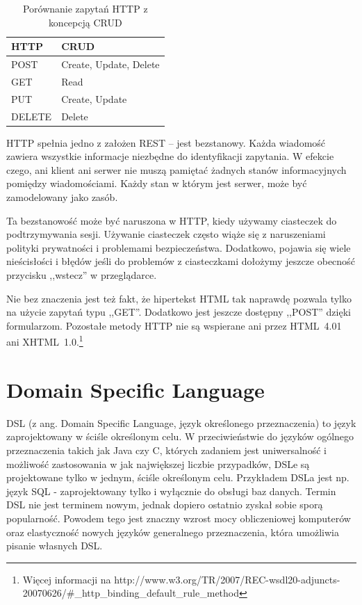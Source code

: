 \documentclass[a4paper,12pt,oneside]{report}
\begin{document}
\begin{table}[h]
  \centering
    \begin{tabular}{|l|l|}\hline
    HTTP   & CRUD \\\hline
    POST   & Create, Update, Delete \\
    GET    & Read \\
    PUT    & Create, Update \\
    DELETE & Delete \\\hline
    \end{tabular}
  \caption{Porównanie zapytań HTTP z koncepcją CRUD\label{rest:crud}}
\end{table}

HTTP spełnia jedno z założen REST -- jest bezstanowy. Każda wiadomość zawiera wszystkie informacje niezbędne do identyfikacji zapytania. W efekcie czego, ani klient ani serwer nie muszą pamiętać żadnych stanów informacyjnych pomiędzy wiadomościami. Każdy stan w którym jest serwer, może być zamodelowany jako zasób.

Ta bezstanowość może być naruszona w HTTP, kiedy używamy ciasteczek do podtrzymywania sesji. Używanie ciasteczek często wiąże się z naruszeniami polityki prywatności i problemami bezpieczeństwa. Dodatkowo, pojawia się wiele nieścisłości i błędów jeśli do problemów z ciasteczkami dołożymy jeszcze obecność przycisku ,,wstecz'' w przeglądarce.

Nie bez znaczenia jest też fakt, że hipertekst HTML tak naprawdę pozwala tylko na użycie zapytań typu ,,GET''. Dodatkowo jest jeszcze dostępny ,,POST'' dzięki formularzom. Pozostałe metody HTTP nie są wspierane ani przez HTML~4.01 ani XHTML~1.0.\footnote{Więcej informacji na http://www.w3.org/TR/2007/REC-wsdl20-adjuncts-20070626/\#\_http\_binding\_default\_rule\_method}

\section{Domain Specific Language}
\label{sec:dsl}
DSL (z ang. Domain Specific Language, język określonego przeznaczenia) to język zaprojektowany w ściśle określonym celu. W przeciwieństwie do języków ogólnego przeznaczenia takich jak Java czy C, których zadaniem jest uniwersalność i możliwość zastosowania w jak największej liczbie przypadków, DSLe są projektowane tylko w jednym, ściśle określonym celu. Przykładem DSLa jest np. język SQL - zaprojektowany tylko i wyłącznie do obsługi baz danych. Termin DSL nie jest terminem nowym, jednak dopiero ostatnio zyskał sobie sporą popularność. Powodem tego jest znaczny wzrost mocy obliczeniowej komputerów oraz elastyczność nowych języków generalnego przeznaczenia, która umożliwia pisanie własnych DSL.
\end{document}
